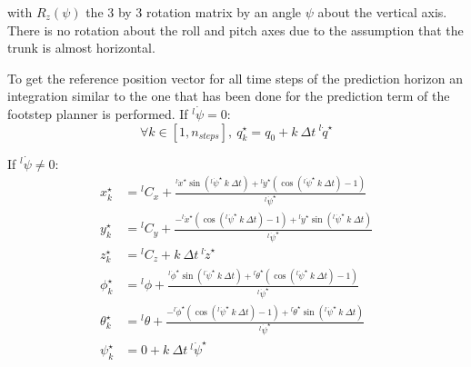\documentclass[a4paper,11pt]{article}
\begin{document}
with $R_z(\psi)$ the 3 by 3 rotation matrix by an angle $\psi$ about the vertical axis. There is no rotation about the roll and pitch axes due to the assumption that the trunk is almost horizontal.


To get the reference position vector for all time steps of the prediction horizon an integration similar to the one that has been done for the prediction term of the footstep planner is performed. If ${}^l\!\dot \psi = 0$:
\begin{equation}
\forall k \in [1, n_{steps}], ~ q_{k}^\star = q_0 + k ~ \Delta t ~  {}^l\! \dot q^\star
\end{equation}

If ${}^l\!\dot \psi \neq 0$:
\begin{align}
x_k^\star &= {}^l\! C_x + \frac{{}^l\!\dot x^\star \sin({}^l\!\dot \psi^\star ~ k ~ \Delta t) + {}^l\!\dot y^\star \left( \cos({}^l\!\dot \psi^\star ~ k ~ \Delta t) - 1 \right)}{{}^l\!\dot \psi^\star} \\
y_k^\star &= {}^l\! C_y + \frac{- {}^l\!\dot x^\star \left( \cos({}^l\!\dot \psi^\star ~ k ~ \Delta t) - 1 \right) + {}^l\!\dot y^\star \sin({}^l\!\dot \psi^\star ~ k ~ \Delta t)}{{}^l\!\dot \psi^\star} \\
z_k^\star &= {}^l\! C_z + k ~ \Delta t ~  {}^l\! \dot z^\star \\
\phi_k^\star &= {}^l\! \phi + \frac{{}^l\!\dot \phi^\star \sin({}^l\!\dot \psi^\star ~ k ~ \Delta t) + {}^l\!\dot \theta^\star \left( \cos({}^l\!\dot \psi^\star ~ k ~ \Delta t) - 1 \right)}{{}^l\!\dot \psi^\star} \\
\theta_k^\star &= {}^l\! \theta + \frac{- {}^l\!\dot \phi^\star \left( \cos({}^l\!\dot \psi^\star ~ k ~ \Delta t) - 1 \right) + {}^l\!\dot \theta^\star \sin({}^l\!\dot \psi^\star ~ k ~ \Delta t)}{{}^l\!\dot \psi^\star} \\
\psi_k^\star &= 0 + k ~ \Delta t ~  {}^l\! \dot \psi^\star \\
\end{align}
\end{document}
